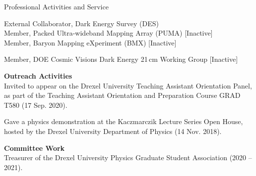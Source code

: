 \documentclass{resume} %
\begin{document}
\begin{rSection}{Professional Activities and Service}

\begin{description}[leftmargin=10em, style=nextline]

\item[Collaborations] External Collaborator, Dark Energy Survey (DES)\\
  Member, Packed Ultra-wideband Mapping Array (PUMA) [Inactive]\\
  Member, Baryon Mapping eXperiment (BMX) [Inactive]

\item[Working Groups] Member, DOE Cosmic Visions Dark Energy 21$\,$cm Working Group [Inactive]


\end{description}

\textbf{Outreach Activities}\\
Invited to appear on the Drexel University Teaching Assistant Orientation Panel, as part of the Teaching Assistant Orientation and Preparation Course GRAD T580 (17 Sep. 2020).

Gave a physics demonstration at the Kaczmarczik Lecture Series Open House, hosted by the Drexel University Department of Physics (14 Nov. 2018).

\textbf{Committee Work}\\
Treasurer of the Drexel University Physics Graduate Student Association (2020 -- 2021).

\end{rSection}



%
%


\end{document}
